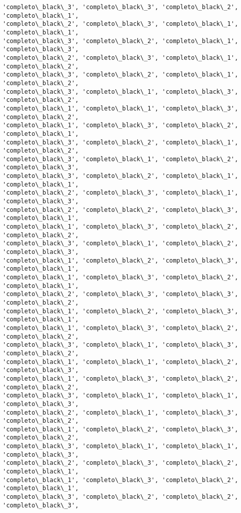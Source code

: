 \documentclass[11pt]{article}
\begin{document}
\begin{Verbatim}[commandchars=\\\{\}]
'completo\_black\_3', 'completo\_black\_3', 'completo\_black\_2', 'completo\_black\_1',
'completo\_black\_2', 'completo\_black\_3', 'completo\_black\_1', 'completo\_black\_1',
'completo\_black\_3', 'completo\_black\_2', 'completo\_black\_1', 'completo\_black\_3',
'completo\_black\_2', 'completo\_black\_3', 'completo\_black\_1', 'completo\_black\_2',
'completo\_black\_3', 'completo\_black\_2', 'completo\_black\_1', 'completo\_black\_2',
'completo\_black\_3', 'completo\_black\_1', 'completo\_black\_3', 'completo\_black\_2',
'completo\_black\_1', 'completo\_black\_1', 'completo\_black\_3', 'completo\_black\_2',
'completo\_black\_1', 'completo\_black\_3', 'completo\_black\_2', 'completo\_black\_1',
'completo\_black\_3', 'completo\_black\_2', 'completo\_black\_1', 'completo\_black\_2',
'completo\_black\_3', 'completo\_black\_1', 'completo\_black\_2', 'completo\_black\_3',
'completo\_black\_3', 'completo\_black\_2', 'completo\_black\_1', 'completo\_black\_1',
'completo\_black\_2', 'completo\_black\_3', 'completo\_black\_1', 'completo\_black\_3',
'completo\_black\_2', 'completo\_black\_2', 'completo\_black\_3', 'completo\_black\_1',
'completo\_black\_1', 'completo\_black\_3', 'completo\_black\_2', 'completo\_black\_2',
'completo\_black\_3', 'completo\_black\_1', 'completo\_black\_2', 'completo\_black\_3',
'completo\_black\_1', 'completo\_black\_2', 'completo\_black\_3', 'completo\_black\_1',
'completo\_black\_1', 'completo\_black\_3', 'completo\_black\_2', 'completo\_black\_1',
'completo\_black\_2', 'completo\_black\_3', 'completo\_black\_3', 'completo\_black\_2',
'completo\_black\_1', 'completo\_black\_2', 'completo\_black\_3', 'completo\_black\_1',
'completo\_black\_1', 'completo\_black\_3', 'completo\_black\_2', 'completo\_black\_2',
'completo\_black\_3', 'completo\_black\_1', 'completo\_black\_3', 'completo\_black\_2',
'completo\_black\_1', 'completo\_black\_1', 'completo\_black\_2', 'completo\_black\_3',
'completo\_black\_1', 'completo\_black\_3', 'completo\_black\_2', 'completo\_black\_2',
'completo\_black\_3', 'completo\_black\_1', 'completo\_black\_1', 'completo\_black\_3',
'completo\_black\_2', 'completo\_black\_1', 'completo\_black\_3', 'completo\_black\_2',
'completo\_black\_1', 'completo\_black\_2', 'completo\_black\_3', 'completo\_black\_2',
'completo\_black\_3', 'completo\_black\_1', 'completo\_black\_1', 'completo\_black\_3',
'completo\_black\_2', 'completo\_black\_3', 'completo\_black\_2', 'completo\_black\_1',
'completo\_black\_1', 'completo\_black\_3', 'completo\_black\_2', 'completo\_black\_1',
'completo\_black\_3', 'completo\_black\_2', 'completo\_black\_2', 'completo\_black\_3',

\end{Verbatim}
\end{document}
